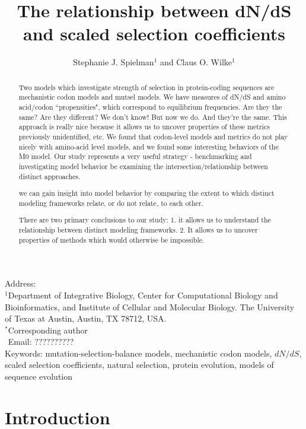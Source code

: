 \documentclass[11pt]{article}
\begin{document}
\title{\textbf{The relationship between dN/dS and scaled selection coefficients}}
\author{Stephanie J. Spielman$^{1}$ and Claus O. Wilke$^{1}$}
\date{}

\maketitle
\noindent
Address:\\
$^1$Department of Integrative Biology, Center for Computational Biology and Bioinformatics, and Institute of Cellular and Molecular Biology.
The University of Texas at Austin, Austin, TX 78712, USA.\\

\bigskip
\noindent
$^*$Corresponding author\\
$\phantom{^*}$Email: ??????????\\

\bigskip
\noindent Keywords: mutation-selection-balance models, mechanistic codon models, $dN/dS$, scaled selection coefficients, natural selection, protein evolution, models of sequence evolution

\newpage
\begin{abstract}
Two models which investigate strength of selection in protein-coding sequences are mechanistic codon models and mutsel models. We have measures of dN/dS and amino acid/codon ``propensities", which correspond to equilibrium frequencies. Are they the same? Are they different? We don't know! But now we do. And they're the same. This approach is really nice because it allows us to uncover properties of these metrics previously unidentified, etc. We found that codon-level models and metrics do not play nicely with amino-acid level models, and we found some interesting behaviors of the M0 model. Our study represents a very useful strategy - benchmarking and investigating model behavior be examining the intersection/relationship between distinct approaches.
  
  we can gain insight into model behavior by comparing the extent to which distinct modeling frameworks relate, or do not relate, to each other.
  
  
  There are two primary conclusions to our study: 1. it allows us to understand the relationship between distinct modeling frameworks. 2. It allows us to uncover properties of methods which would otherwise be impossible.

\end{abstract}

\section*{Introduction}
\end{document}

